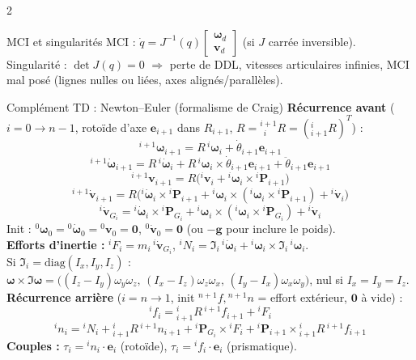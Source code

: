 \documentclass[10pt,a4paper]{article}
\newcommand{\vect}[1]{\mathbf{#1}}
\begin{document}
\begin{multicols}{2}
\begin{fbx}{MCI et singularités}
MCI : $\dot q=J^{-1}(q)\begin{bmatrix}\boldsymbol\omega_d\\\vect v_d\end{bmatrix}$ (si $J$ carrée inversible).\\
Singularité : $\det J(q)=0$ $\Rightarrow$ perte de DDL, vitesses articulaires infinies, MCI mal posé (lignes nulles ou liées, axes alignés/parallèles).
\end{fbx}

\begin{fbx}{Complément TD : Newton--Euler (formalisme de Craig)}
\textbf{Récurrence avant} ($i=0\to n-1$, rotoïde d'axe $\vect e_{i+1}$ dans $R_{i+1}$, $R={}^{i+1}_{\ \ i}R=({}^{i}_{i+1}R)^T$) :
\[{}^{i+1}\boldsymbol\omega_{i+1}=R\,{}^i\boldsymbol\omega_i+\dot\theta_{i+1}\vect e_{i+1}\]
\[{}^{i+1}\dot{\boldsymbol\omega}_{i+1}=R\,{}^i\dot{\boldsymbol\omega}_i+R\,{}^i\boldsymbol\omega_i\times\dot\theta_{i+1}\vect e_{i+1}+\ddot\theta_{i+1}\vect e_{i+1}\]
\[{}^{i+1}\vect v_{i+1}=R\big({}^i\vect v_i+{}^i\boldsymbol\omega_i\times{}^i\vect P_{i+1}\big)\]
\[{}^{i+1}\dot{\vect v}_{i+1}=R\big({}^i\dot{\boldsymbol\omega}_i\times{}^i\vect P_{i+1}+{}^i\boldsymbol\omega_i\times({}^i\boldsymbol\omega_i\times{}^i\vect P_{i+1})+{}^i\dot{\vect v}_i\big)\]
\[{}^{i}\dot{\vect v}_{G_i}={}^i\dot{\boldsymbol\omega}_i\times{}^i\vect P_{G_i}+{}^i\boldsymbol\omega_i\times({}^i\boldsymbol\omega_i\times{}^i\vect P_{G_i})+{}^i\dot{\vect v}_i\]
Init : ${}^0\boldsymbol\omega_0={}^0\dot{\boldsymbol\omega}_0={}^0\vect v_0=\vect 0$, ${}^0\dot{\vect v}_0=\vect 0$ (ou $-\vect g$ pour inclure le poids).\\[2pt]
\textbf{Efforts d'inertie :} ${}^iF_i=m_i\,{}^i\dot{\vect v}_{G_i}$, \quad ${}^iN_i=\mathfrak I_i\,{}^i\dot{\boldsymbol\omega}_i+{}^i\boldsymbol\omega_i\times\mathfrak I_i\,{}^i\boldsymbol\omega_i$.\\
Si $\mathfrak I_i=\mathrm{diag}(I_x,I_y,I_z)$ : $\boldsymbol\omega\times\mathfrak I\boldsymbol\omega=\big((I_z-I_y)\omega_y\omega_z,\,(I_x-I_z)\omega_z\omega_x,\,(I_y-I_x)\omega_x\omega_y\big)$, nul si $I_x=I_y=I_z$.\\[2pt]
\textbf{Récurrence arrière} ($i=n\to1$, init ${}^{n+1}f,{}^{n+1}n$ = effort extérieur, $\vect 0$ à vide) :
\[{}^if_i={}^i_{i+1}R\,{}^{i+1}f_{i+1}+{}^iF_i\]
\[{}^in_i={}^iN_i+{}^i_{i+1}R\,{}^{i+1}n_{i+1}+{}^i\vect P_{G_i}\times{}^iF_i+{}^i\vect P_{i+1}\times{}^i_{i+1}R\,{}^{i+1}f_{i+1}\]
\textbf{Couples :} $\tau_i={}^in_i\cdot\vect e_i$ (rotoïde), $\tau_i={}^if_i\cdot\vect e_i$ (prismatique).
\end{fbx}
\end{multicols}
\end{document}
